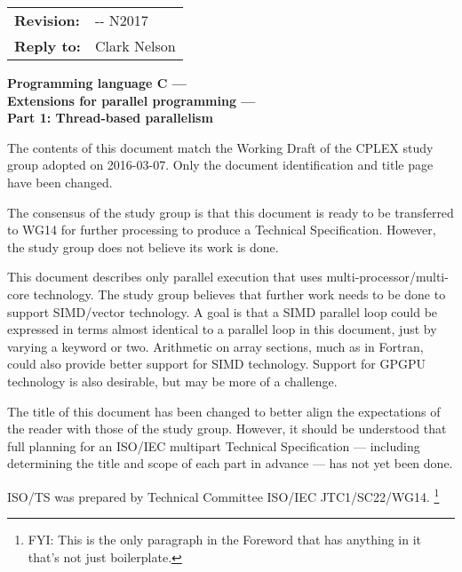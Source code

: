 \documentclass[
	techspec,	%
	final,		%
	notcopyright,	%
	letterpaper	%
	]{isov2}
\newcommand{\wgdocno}{N2017}
\newcommand{\epptsno}{\placeholder{EPPTS}}
\renewcommand{\extrahead}{\Year-\Mo-\Dy{} \wgdocno}
\begin{document}
\begin{cover}
\begin{tabular}{l l}
\textbf{Revision:} & \extrahead \\
\textbf{Reply to:} & Clark Nelson
\end{tabular}

{\huge
\bfseries
Programming language C --- \\
Extensions for parallel programming --- \\
Part 1: Thread-based parallelism
}

{\large
The contents of this document match
the Working Draft of the CPLEX study group adopted on 2016-03-07.
Only the document identification and title page have been changed.

The consensus of the study group is that this document is ready
to be transferred to WG14 for further processing
to produce a Technical Specification.
However, the study group does not believe its work is done.

This document describes only parallel execution
that uses multi-processor/multi-core technology.
The study group believes that further work needs to be done
to support SIMD/vector technology.
A goal is that a SIMD parallel loop could be expressed
in terms almost identical to a parallel loop in this document,
just by varying a keyword or two.
Arithmetic on array sections, much as in Fortran,
could also provide better support for SIMD technology.
Support for GPGPU technology is also desirable,
but may be more of a challenge.

The title of this document has been changed
to better align the expectations of the reader
with those of the study group.
However, it should be understood that full planning
for an ISO/IEC multipart Technical Specification ---
including determining the title and scope of each part in advance ---
has not yet been done.
}
\clearpage
\end{cover}


\begin{foreword}


ISO/TS
\epptsno{}
was prepared by Technical Committee ISO/IEC JTC1/SC22/WG14.
\footnote{FYI:
This is the only paragraph in the Foreword that has anything in it
that's not just boilerplate.
}

\fwdnopatents
\end{foreword}

\begin{introduction}
\intropatents
\end{introduction}
\end{document}
